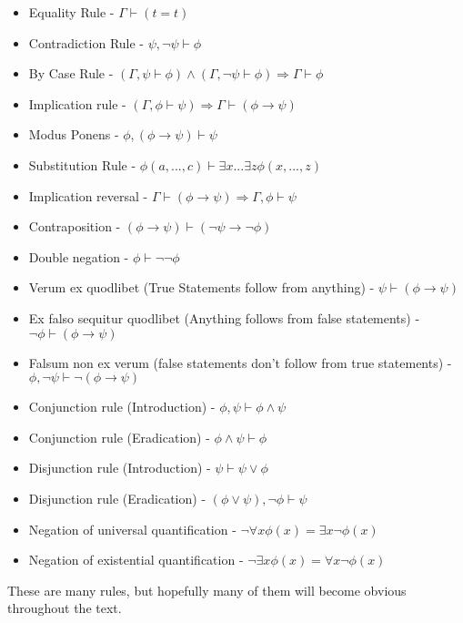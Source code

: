 \begin{itemize}
	\item[] Equality Rule - $\Gamma\vdash (t=t)$
	\item[] Contradiction Rule - $\psi, \neg\psi \vdash \phi$
	\item[] By Case Rule - $(\Gamma,\psi\vdash\phi)\wedge(\Gamma,\neg\psi\vdash\phi) \Rightarrow \Gamma\vdash\phi$
	\item[] Implication rule - $(\Gamma,\phi\vdash\psi)\Rightarrow\Gamma\vdash(\phi\rightarrow\psi)$
	\item[] Modus Ponens - $\phi, (\phi\rightarrow\psi) \vdash \psi$
	\item[] Substitution Rule - $\phi(a,...,c) \vdash \exists x ... \exists z \phi(x,...,z)$
	\item[] Implication reversal - $\Gamma\vdash(\phi\rightarrow\psi) \Rightarrow \Gamma,\phi\vdash\psi$
	\item[] Contraposition - $(\phi\rightarrow\psi)\vdash(\neg\psi\rightarrow\neg\phi)$
	\item[] Double negation - $\phi\vdash\neg\neg\phi$
	\item[] Verum ex quodlibet (True Statements follow from anything) - $\psi \vdash (\phi\rightarrow\psi)$
	\item[] Ex falso sequitur quodlibet (Anything follows from false statements) - $\neg\phi\vdash(\phi\rightarrow\psi)$
	\item[] Falsum non ex verum (false statements don't follow from true statements) - $\phi,\neg\psi\vdash\neg(\phi\rightarrow\psi)$
	\item[] Conjunction rule (Introduction) - $\phi,\psi\vdash\phi\wedge\psi$
	\item[] Conjunction rule (Eradication) - $\phi\wedge\psi\vdash\phi$
	\item[] Disjunction rule (Introduction) - $\psi\vdash\psi\vee\phi$
	\item[] Disjunction rule (Eradication) - $(\phi\vee\psi),\neg\phi \vdash \psi$
	\item[] Negation of universal quantification - $\neg\forall x\phi(x) = \exists x\neg\phi(x)$
	\item[] Negation of existential quantification - $\neg\exists x\phi(x) = \forall x\neg\phi(x)$
\end{itemize}

These are many rules, but hopefully many of them will become obvious throughout the text.


